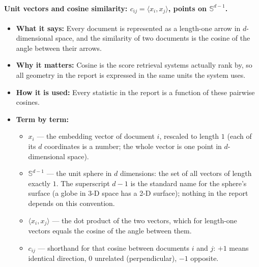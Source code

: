 \documentclass[11pt,letterpaper]{article}
\newcommand{\sphere}{\mathbb{S}^{d-1}}
\begin{document}
\paragraph{Unit vectors and cosine similarity: $c_{ij} = \langle x_i, x_j
\rangle$, points on $\sphere$.}
\begin{itemize}
  \item \textbf{What it says:} Every document is represented as a
  length-one arrow in $d$-dimensional space, and the similarity of two
  documents is the cosine of the angle between their arrows.
  \item \textbf{Why it matters:} Cosine is the score retrieval systems
  actually rank by, so all geometry in the report is expressed in the same
  units the system uses.
  \item \textbf{How it is used:} Every statistic in the report is a
  function of these pairwise cosines.
  \item \textbf{Term by term:}
  \begin{itemize}
    \item $x_i$ --- the embedding vector of document $i$, rescaled to
    length $1$ (each of its $d$ coordinates is a number; the whole vector
    is one point in $d$-dimensional space).
    \item $\sphere$ --- the unit sphere in $d$ dimensions: the set of all
    vectors of length exactly $1$. The superscript $d-1$ is the standard
    name for the sphere's surface (a globe in 3-D space has a 2-D surface);
    nothing in the report depends on this convention.
    \item $\langle x_i, x_j \rangle$ --- the dot product of the two
    vectors, which for length-one vectors equals the cosine of the angle
    between them.
    \item $c_{ij}$ --- shorthand for that cosine between documents $i$ and
    $j$: $+1$ means identical direction, $0$ unrelated (perpendicular),
    $-1$ opposite.
  \end{itemize}
\end{itemize}
\end{document}
